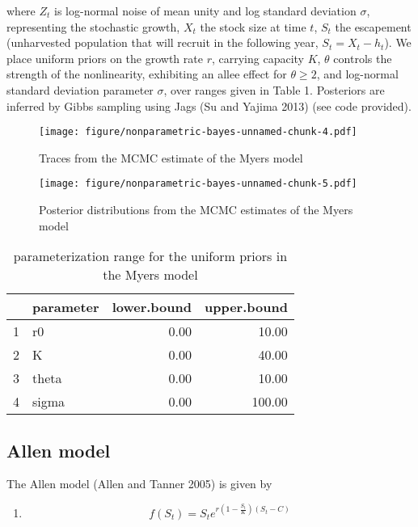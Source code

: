\documentclass[author-year, review]{elsarticle} %
\makeatletter
\def\maxwidth{\ifdim\Gin@nat@width>\linewidth\linewidth
\else\Gin@nat@width\fi}
\let\Oldincludegraphics\includegraphics
\renewcommand{\includegraphics}[1]{\Oldincludegraphics[width=\maxwidth]{#1}}
\makeatother
\begin{document}
where $Z_t$ is log-normal noise of mean unity and log standard deviation
$\sigma$, representing the stochastic growth, $X_t$ the stock size at
time $t$, $S_t$ the escapement (unharvested population that will recruit
in the following year, $S_t = X_t - h_t$). We place uniform priors on
the growth rate $r$, carrying capacity $K$, $\theta$ controls the
strength of the nonlinearity, exhibiting an allee effect for
$\theta \geq 2$, and log-normal standard deviation parameter $\sigma$,
over ranges given in Table 1. Posteriors are inferred by Gibbs sampling
using Jags (Su and Yajima 2013) (see code provided).

\begin{figure}[htbp]
\centering
\texttt{[image: figure/nonparametric-bayes-unnamed-chunk-4.pdf]}
\caption{Traces from the MCMC estimate of the Myers model}
\end{figure}

\begin{figure}[htbp]
\centering
\texttt{[image: figure/nonparametric-bayes-unnamed-chunk-5.pdf]}
\caption{Posterior distributions from the MCMC estimates of the Myers
model}
\end{figure}

\begin{table}[ht]
\begin{center}
\begin{tabular}{rlrr}
  \hline
 & parameter & lower.bound & upper.bound \\ 
  \hline
1 & r0 & 0.00 & 10.00 \\ 
  2 & K & 0.00 & 40.00 \\ 
  3 & theta & 0.00 & 10.00 \\ 
  4 & sigma & 0.00 & 100.00 \\ 
   \hline
\end{tabular}
\caption{parameterization range for the uniform priors in the Myers model}
\end{center}
\end{table}

\subsection{Allen model}\label{allen-model}

The Allen model (Allen and Tanner 2005) is given by

\begin{enumerate}
\def\labelenumi{(\arabic{enumi})}
\setcounter{enumi}{2}
\itemsep1pt\parskip0pt
\item
  \[f(S_t) = S_t e^{r \left(1 - \frac{S_t}{K}\right)\left(S_t - C\right)} \]
\end{enumerate}
\end{document}
